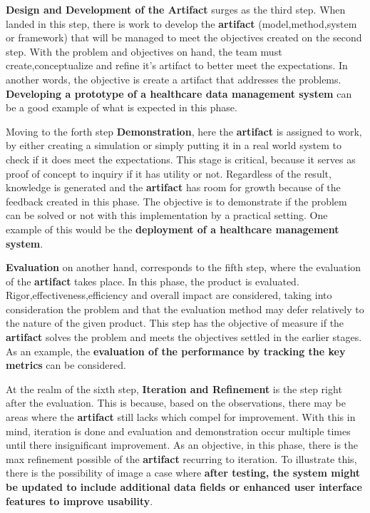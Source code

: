 \textbf{Design and Development of the Artifact} surges as the third step. When landed in this step, there is work to develop the \textbf{artifact} (model,method,system or framework) that will be managed to meet the objectives created on the second step. With the problem and objectives on hand, the team must create,conceptualize and refine it's artifact to better meet the expectations. In another words, the objective is create a artifact that addresses the problems. \textbf{Developing a prototype of a healthcare data management system} can be a good example of what is expected in this phase.

 Moving to the forth step \textbf{Demonstration}, here the \textbf{artifact} is assigned to work, by either creating a simulation or simply putting it in a real world system to check if it does meet the expectations. This stage is critical, because it serves as proof of concept to inquiry if it has utility or not. Regardless of the result, knowledge is generated and the \textbf{artifact} has room for growth because of the feedback created in this phase. The objective is to demonstrate if the problem can be solved or not with this implementation by a practical setting. One example of this would be the \textbf{deployment of a healthcare management system}.

 \textbf{Evaluation} on another hand, corresponds to the fifth step, where the evaluation of the \textbf{artifact} takes place. In this phase, the product is evaluated. Rigor,effectiveness,efficiency and overall impact are considered, taking into consideration the problem and that the evaluation method may defer relatively to the nature of the given product. This step has the objective of measure if the \textbf{artifact} solves the problem and meets the objectives settled in the earlier stages. As an example, the \textbf{evaluation of the performance by tracking the key metrics} can be considered.

 At the realm of the sixth step, \textbf{Iteration and Refinement} is the step right after the evaluation. This is because, based on the observations, there may be areas where the \textbf{artifact} still lacks which compel for improvement. With this in mind, iteration is done and evaluation and demonstration occur multiple times until there insignificant improvement. As an objective, in this phase, there is the max refinement possible of the \textbf{artifact} recurring to iteration. To illustrate this, there is the possibility of image a case where \textbf{after testing, the system might be updated to include additional data fields or enhanced user interface features to improve usability}.

